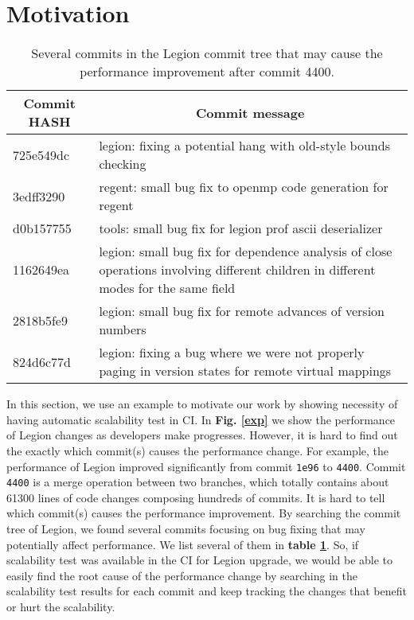 \section{Motivation}
\label{motivation}

\begin{table}[h]
\centering
\caption{Several commits in the Legion commit tree that may cause the performance improvement after commit 4400.}
\label{commits}
\begin{tabular}{|p{0.3cm}|p{5.8cm}|}
\hline
\multicolumn{1}{|c|}{Commit HASH} & \multicolumn{1}{c|}{Commit message}                                                                                                  \\ \hline
725e549dc                         & legion: fixing a potential hang with old-style bounds checking                                                                       \\ \hline
3edff3290                         & regent: small bug fix to openmp code generation for regent                                                                           \\ \hline
d0b157755                         & tools: small bug fix for legion prof ascii deserializer                                                                              \\ \hline
1162649ea                         & legion: small bug fix for dependence analysis of close operations involving different children in different modes for the same field \\ \hline
2818b5fe9                         & legion: small bug fix for remote advances of version numbers                                                                         \\ \hline
824d6c77d                         & legion: fixing a bug where we were not properly paging in version states for remote virtual mappings                                 \\ \hline
\end{tabular}
\end{table}

In this section, we use an example to motivate our work by showing necessity of having automatic scalability test in CI. In \textbf{Fig. \ref{exp}} we show the performance of Legion changes as developers make progresses. However,  it is hard to find out the exactly which commit(s) causes the performance change. For example, the performance of Legion improved significantly from commit \texttt{1e96} to \texttt{4400}. Commit \texttt{4400} is a merge operation between two branches, which totally contains about 61300 lines of code changes composing hundreds of commits. It is hard to tell which commit(s) causes the performance improvement. By searching the commit tree of Legion, we found several commits focusing on bug fixing that may potentially affect performance. We list several of them in \textbf{table \ref{commits}}. So, if scalability test was available in the CI for Legion upgrade, we would be able to easily find the root cause of the performance change by searching in the scalability test results for each commit and keep tracking the changes that benefit or hurt the scalability. 

